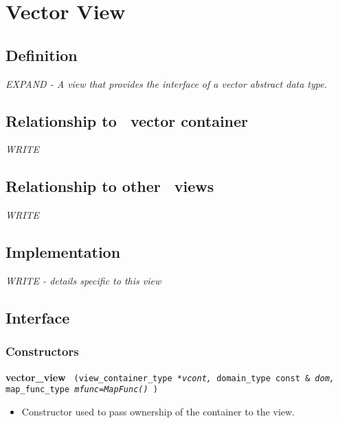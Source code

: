 
\section{Vector View} \label{sec-vec-vw}

\subsection{Definition}

\textit{EXPAND - A view that provides the interface of a vector abstract data type.}

\subsection{Relationship to \stapl\ vector container}

\textit{WRITE}

\subsection{Relationship to other \stapl\ views}

\textit{WRITE}

\subsection{Implementation}

\textit{WRITE - details specific to this view}

\subsection{Interface} \label{sec-vec-vw-inter}

\subsubsection{Constructors}

\noindent
\textbf{vector\_view}%
\texttt{%
(view\_container\_type
\textit{*vcont,}%
domain\_type const \&
\textit{dom,}%
map\_func\_type
\textit{mfunc=MapFunc()}%
)
}

\begin{itemize}
\item
Constructor used to pass ownership of the container to the view.
\end{itemize}

